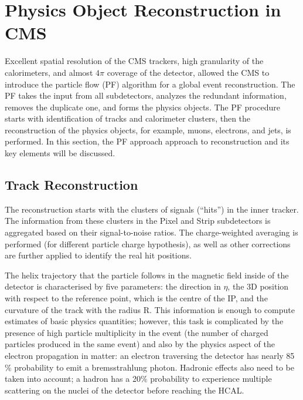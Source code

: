 
\chapter{Physics Object Reconstruction in CMS} \label{sec:cms_reco}

Excellent spatial resolution of the CMS trackers, high granularity of the calorimeters, and almost $4\pi$ coverage of the detector, allowed the CMS to introduce the particle flow (PF) algorithm \cite{Particle_flow} for a global event reconstruction. The PF takes the input from all subdetectors, analyzes the redundant information, removes the duplicate one, and forms the physics objects. The PF procedure starts with identification of tracks and calorimeter clusters, then the reconstruction of the physics objects, for example, muons, electrons, and jets, is performed. In this section, the PF approach approach to reconstruction and its key elements will be discussed.

    
\section{Track Reconstruction}\label{sec:track_reconstruction}

The reconstruction starts with the clusters of signals (``hits'') in the inner tracker. The information from these clusters in the Pixel and Strip subdetectors is aggregated based on their signal-to-noise ratios. The charge-weighted averaging is performed (for different particle charge hypothesis), as well as other corrections are further applied to identify the real hit positions. 

The helix trajectory that the particle follows in the magnetic field inside of the detector is characterised by five parameters: the direction in $\eta$, the 3D position with respect to the reference point, which is the centre of the IP, and the curvature of the track with the radius R. This information is enough to compute estimates of basic physics quantities; however, this task is complicated by the presence of high particle multiplicity in the event (the number of charged particles produced in the same event) and also by the physics aspect of the electron propagation in matter: an electron traversing the detector has nearly 85 $\%$ probability to emit a bremsstrahlung photon. Hadronic effects also need to be taken into account; a hadron has a 20$\%$ probability to experience multiple scattering on the nuclei of the detector before reaching the HCAL. 

